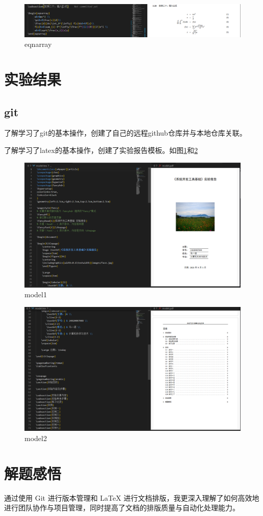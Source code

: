 \documentclass[a4paper]{article}
\begin{document}
    \begin{figure}[H]
    \centering
    \includegraphics[width=1\textwidth]{images/enq.png}
    \caption{eqnarray}
    \end{figure}
\section{实验结果}

\subsection{git}
了解学习了git的基本操作，创建了自己的远程github仓库并与本地仓库关联。

了解学习了latex的基本操作，创建了实验报告模板。如图\ref{model1}和\ref{model2}
    \begin{figure}[H]
    \centering
    \includegraphics[width=1\textwidth]{images/model1.png}
    \caption{model1}
    \label{model1}
    \end{figure}
    \begin{figure}[H]
    \centering
    \includegraphics[width=1\textwidth]{images/model2.png}
    \caption{model2}
    \label{model2}
    \end{figure}
\section{解题感悟}
通过使用 Git 进行版本管理和 LaTeX 进行文档排版，我更深入理解了如何高效地进行团队协作与项目管理，同时提高了文档的排版质量与自动化处理能力。
\end{document}
